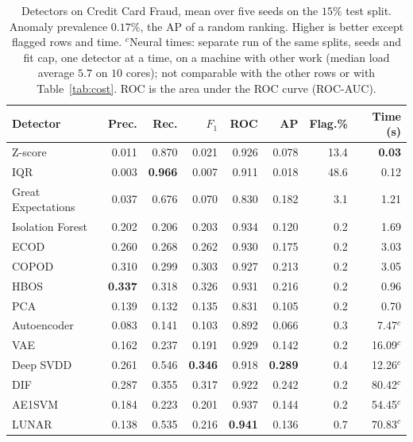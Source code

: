 \documentclass[conference]{IEEEtran}
\begin{document}
\begin{table}[t]
\caption{Detectors on Credit Card Fraud, mean over five seeds on the
$15\%$ test split. Anomaly prevalence $0.17\%$, the AP of a random ranking. Higher is better except flagged rows and time. $^{c}$Neural times: separate run of the same splits, seeds and fit cap, one detector at a time, on a machine with other work (median load average $5.7$ on $10$ cores); not comparable with the other rows or with Table~\ref{tab:cost}. ROC is the area under the ROC curve (ROC-AUC).}
\label{tab:fraud}
\centering
\setlength{\tabcolsep}{3pt}
\footnotesize
\begin{tabular}{lrrrrrrr}
\toprule
Detector & Prec. & Rec. & $F_1$ & ROC & AP & Flag.\% & Time (s) \\
\midrule
Z-score            & 0.011 & 0.870 & 0.021 & 0.926 & 0.078 & 13.4 & \textbf{0.03} \\
IQR                & 0.003 & \textbf{0.966} & 0.007 & 0.911 & 0.018 & 48.6 & 0.12 \\
Great Expectations & 0.037 & 0.676 & 0.070 & 0.830 & 0.182 & 3.1 & 1.21 \\
\midrule
Isolation Forest   & 0.202 & 0.206 & 0.203 & 0.934 & 0.120 & 0.2 & 1.69 \\
ECOD               & 0.260 & 0.268 & 0.262 & 0.930 & 0.175 & 0.2 & 3.03 \\
COPOD              & 0.310 & 0.299 & 0.303 & 0.927 & 0.213 & 0.2 & 3.05 \\
HBOS               & \textbf{0.337} & 0.318 & 0.326 & 0.931 & 0.216 & 0.2 & 0.96 \\
PCA                & 0.139 & 0.132 & 0.135 & 0.831 & 0.105 & 0.2 & 0.70 \\
\midrule
Autoencoder        & 0.083 & 0.141 & 0.103 & 0.892 & 0.066 & 0.3 & 7.47$^{c}$ \\
VAE                & 0.162 & 0.237 & 0.191 & 0.929 & 0.142 & 0.2 & 16.09$^{c}$ \\
Deep SVDD          & 0.261 & 0.546 & \textbf{0.346} & 0.918 & \textbf{0.289} & 0.4 & 12.26$^{c}$ \\
DIF                & 0.287 & 0.355 & 0.317 & 0.922 & 0.242 & 0.2 & 80.42$^{c}$ \\
AE1SVM             & 0.184 & 0.223 & 0.201 & 0.937 & 0.144 & 0.2 & 54.45$^{c}$ \\
LUNAR              & 0.138 & 0.535 & 0.216 & \textbf{0.941} & 0.136 & 0.7 & 70.83$^{c}$ \\
\bottomrule
\end{tabular}
\end{table}
\end{document}
